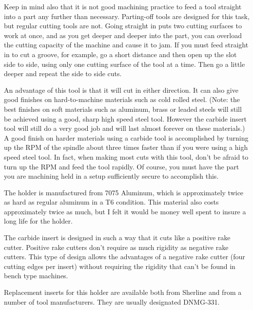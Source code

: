 
Keep in mind also that it is not good machining practice to feed a tool straight
into a part any further than necessary. Parting-off tools are designed for this
task, but regular cutting tools are not. Going straight in puts two cutting
surfaces to work at once, and as you get deeper and deeper into the part, you
can overload the cutting capacity of the machine and cause it to jam. If you
must feed straight in to cut a groove, for example, go a short distance and then
open up the slot side to side, using only one cutting surface of the tool at a
time. Then go a little deeper and repeat the side to side cuts.


An advantage of this tool is that it will cut in either direction. It can also
give good finishes on hard-to-machine materials such as cold rolled steel.
(Note: the best finishes on soft materials such as aluminum, brass or leaded
steels will still be achieved using a good, sharp high speed steel tool. However
the carbide insert tool will still do a very good job and will last almost
forever on these materials.) A good finish on harder materials using a carbide
tool is accomplished by turning up the RPM of the spindle about three times
faster than if you were using a high speed steel tool. In fact, when making most
cuts with this tool, don't be afraid to turn up the RPM and feed the tool
rapidly. Of course, you must have the part you are machining held in a setup
sufficiently secure to accomplish this.


The holder is manufactured from 7075 Aluminum, which is approximately twice as
hard as regular aluminum in a T6 condition. This material also costs
approximately twice as much, but I felt it would be money well spent to insure a
long life for the holder.


The carbide insert is designed in such a way that it cuts like a positive rake
cutter. Positive rake cutters don't require as much rigidity as negative rake
cutters. This type of design allows the advantages of a negative rake cutter
(four cutting edges per insert) without requiring the rigidity that can't be
found in bench type machines.

Replacement inserts for this holder are available both from Sherline and from a
number of tool manufacturers. They are usually designated DNMG-331.

